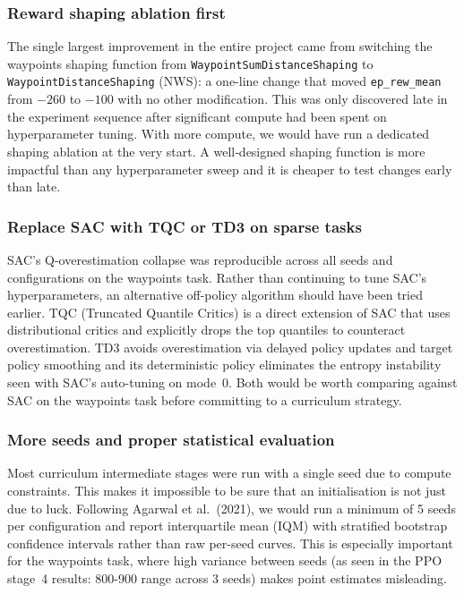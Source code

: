 \documentclass[11pt,a4paper]{article}
\begin{document}
\subsubsection{Reward shaping ablation first}

The single largest improvement in the entire project came from switching the waypoints shaping function from \texttt{WaypointSumDistanceShaping} to \texttt{WaypointDistanceShaping} (NWS): a one-line change that moved \texttt{ep\_rew\_mean} from $-260$ to $-100$ with no other modification. This was only discovered late in the experiment sequence after significant compute had been spent on hyperparameter tuning. With more compute, we would have run a dedicated shaping ablation at the very start. A well‑designed shaping function is more impactful than any hyperparameter sweep and it is cheaper to test changes early than late.

\subsubsection{Replace SAC with TQC or TD3 on sparse tasks}

SAC's Q-overestimation collapse was reproducible across all seeds and configurations on the waypoints task. Rather than continuing to tune SAC's hyperparameters, an alternative off-policy algorithm should have been tried earlier. TQC (Truncated Quantile Critics) is a direct extension of SAC that uses distributional critics and explicitly drops the top quantiles to counteract overestimation. TD3 avoids overestimation via delayed policy updates and target policy smoothing and its deterministic policy eliminates the entropy instability seen with SAC's auto-tuning on mode~0. Both would be worth comparing against SAC on the waypoints task before committing to a curriculum strategy.

\subsubsection{More seeds and proper statistical evaluation}

Most curriculum intermediate stages were run with a single seed due to compute constraints. This makes it impossible to be sure that an initialisation is not just due to luck. Following Agarwal et al.~(2021)\cite{agarwal2021statisticalprecipice}, we would run a minimum of 5 seeds per configuration and report interquartile mean (IQM) with stratified bootstrap confidence intervals rather than raw per-seed curves. This is especially important for the waypoints task, where high variance between seeds (as seen in the PPO stage~4 results: 800-900 range across 3 seeds) makes point estimates misleading.
\end{document}
